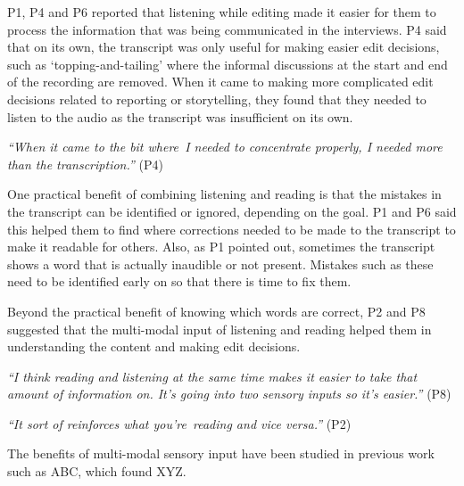 



P1, P4 and P6 reported that listening while editing made it easier for them to process the information that was
being communicated in the interviews.  P4 said that on its own, the transcript was only useful for making easier edit
decisions, such as `topping-and-tailing' where the informal discussions at the start and end of the recording are
removed.  When it came to making more complicated edit decisions related to reporting or storytelling, they found that
they needed to listen to the audio as the transcript was insufficient on its own.

\textit{``When it came to the bit where I needed to concentrate properly, I needed more than the transcription.''} (P4)

One practical benefit of combining listening and reading is that the mistakes in the transcript can be identified or 
ignored, depending on the goal.  P1 and P6 said this helped them to find where corrections needed to be made to the
transcript to make it readable for others. Also, as P1 pointed out, sometimes the transcript shows a word that is
actually inaudible or not present. Mistakes such as these need to be identified early on so that there is time to fix
them.

Beyond the practical benefit of knowing which words are correct, P2 and P8 suggested that the multi-modal input of
listening and reading helped them in understanding the content and making edit decisions.

\textit{``I think reading and listening at the same time makes it easier to take that amount of information on. It's
going into two sensory inputs so it's easier.''} (P8)

\textit{``It sort of reinforces what you're reading and vice versa.''} (P2)

The benefits of multi-modal sensory input have been studied in previous work such as ABC, which found XYZ.


